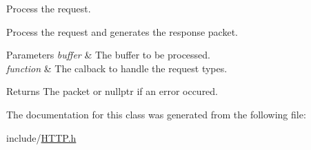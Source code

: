 Process the request. 

Process the request and generates the response packet.


\begin{DoxyParams}{Parameters}
{\em buffer} & The buffer to be processed. \\
\hline
{\em function} & The calback to handle the request types.\\
\hline
\end{DoxyParams}
\begin{DoxyReturn}{Returns}
The packet or nullptr if an error occured. 
\end{DoxyReturn}


The documentation for this class was generated from the following file\+:\begin{DoxyCompactItemize}
\item 
include/\hyperlink{_h_t_t_p_8h}{H\+T\+T\+P.\+h}\end{DoxyCompactItemize}
